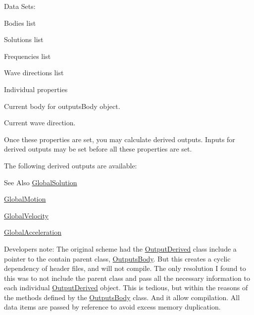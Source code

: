 Data Sets\-:
\begin{DoxyEnumerate}
\item Bodies list
\item Solutions list
\item Frequencies list
\item Wave directions list
\end{DoxyEnumerate}

Individual properties
\begin{DoxyEnumerate}
\item Current body for outputs\-Body object.
\item Current wave direction.
\end{DoxyEnumerate}

Once these properties are set, you may calculate derived outputs. Inputs for derived outputs may be set before all these properties are set.

The following derived outputs are available\-: \begin{DoxySeeAlso}{See Also}
\hyperlink{class_global_solution}{Global\-Solution} 

\hyperlink{class_global_motion}{Global\-Motion} 

\hyperlink{class_global_velocity}{Global\-Velocity} 

\hyperlink{class_global_acceleration}{Global\-Acceleration}
\end{DoxySeeAlso}

\begin{DoxyItemize}
\item Developers note\-: The original scheme had the \hyperlink{class_output_derived}{Output\-Derived} class include a pointer to the contain parent class, \hyperlink{class_outputs_body}{Outputs\-Body}. But this creates a cyclic dependency of header files, and will not compile. The only resolution I found to this was to not include the parent class and pass all the necessary information to each individual \hyperlink{class_output_derived}{Output\-Derived} object. This is tedious, but within the reasons of the methods defined by the \hyperlink{class_outputs_body}{Outputs\-Body} class. And it allow compilation. All data items are passed by reference to avoid excess memory duplication. 
\end{DoxyItemize}


